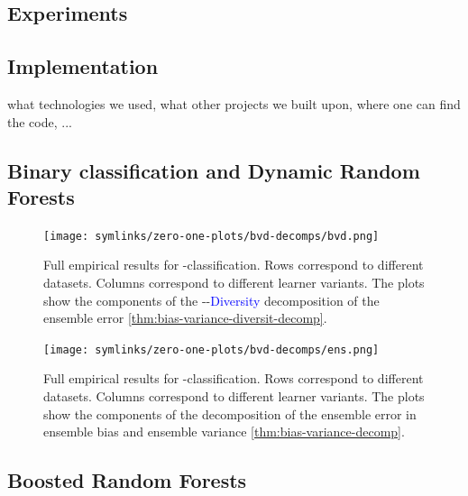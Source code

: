 \documentclass[
    a4paper, %
	fontsize=10pt, %
	twoside=false, %
]{kaobook}
\begin{document}
\begin{titlepage}
\chapter{Experiments}

\section{Implementation}

what technologies we used, what other projects we built upon, where one can find the code, ...

\section{Binary classification and Dynamic Random Forests}
\label{sec:drf-full-results}



\begin{figure}[hb]
	\texttt{[image: symlinks/zero-one-plots/bvd-decomps/bvd.png]}
	\caption{
        Full empirical results for \zeroone-classification. Rows correspond to different datasets. Columns correspond to different learner variants. The plots show the components of the 
        \textcolor{orange}{}-\textcolor{green}{}-\textcolor{blue}{Diversity} decomposition of the ensemble error \ref{thm:bias-variance-diversit-decomp}.
    }
    \label{fig:zero-one-bvd-plots}
\end{figure}

\begin{figure}[hb]
	\texttt{[image: symlinks/zero-one-plots/bvd-decomps/ens.png]}
	\caption{
        Full empirical results for \zeroone-classification. Rows correspond to different datasets. Columns correspond to different learner variants. The plots show the components of the 
        decomposition of the ensemble error in ensemble bias and ensemble variance \ref{thm:bias-variance-decomp}.
    }
    \label{fig:zero-one-bvd-plots}
\end{figure}


\section{Boosted Random Forests}


\end{titlepage}
\end{document}
